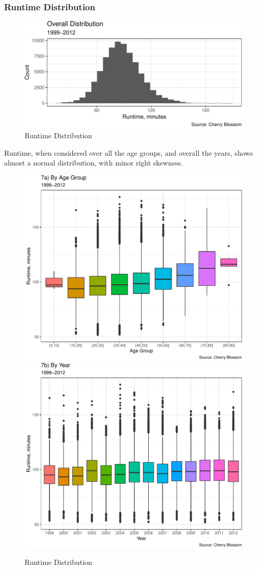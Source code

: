 \documentclass[
]{article}
\begin{document}
\hypertarget{runtime-distribution}{%
\subsubsection{Runtime Distribution}\label{runtime-distribution}}

\begin{figure}[H]

{\centering \includegraphics{case_study02_files/figure-latex/unnamed-chunk-14-1} 

}

\caption{Runtime Distribution}\label{fig:unnamed-chunk-14}
\end{figure}

Runtime, when considered over all the age groups, and overall the years,
shows almost a normal distribution, with minor right skewness.

\begin{figure}[H]

\includegraphics[width=.49\linewidth,]{case_study02_files/figure-latex/unnamed-chunk-15-1} \includegraphics[width=.49\linewidth,]{case_study02_files/figure-latex/unnamed-chunk-15-2} \hfill{}

\caption{Runtime Distribution}\label{fig:unnamed-chunk-15}
\end{figure}
\end{document}
